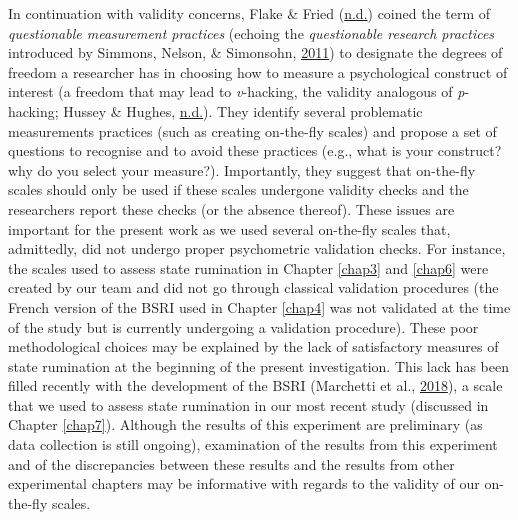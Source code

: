 \documentclass[a4paper,12pt,twoside,onecolumn,openright,final,oldfontcommands]{memoir}
\begin{document}
In continuation with validity concerns, Flake \& Fried (\protect\hyperlink{ref-flake_measurement_2019}{n.d.}) coined the term of \emph{questionable measurement practices} (echoing the \emph{questionable research practices} introduced by Simmons, Nelson, \& Simonsohn, \protect\hyperlink{ref-simmons_false-positive_2011}{2011}) to designate the degrees of freedom a researcher has in choosing how to measure a psychological construct of interest (a freedom that may lead to \emph{v}-hacking, the validity analogous of \emph{p}-hacking; Hussey \& Hughes, \protect\hyperlink{ref-hussey_hidden_2018}{n.d.}). They identify several problematic measurements practices (such as creating on-the-fly scales) and propose a set of questions to recognise and to avoid these practices (e.g., what is your construct? why do you select your measure?). Importantly, they suggest that on-the-fly scales should only be used if these scales undergone validity checks and the researchers report these checks (or the absence thereof). These issues are important for the present work as we used several on-the-fly scales that, admittedly, did not undergo proper psychometric validation checks. For instance, the scales used to assess state rumination in Chapter \ref{chap3} and \ref{chap6} were created by our team and did not go through classical validation procedures (the French version of the BSRI used in Chapter \ref{chap4} was not validated at the time of the study but is currently undergoing a validation procedure). These poor methodological choices may be explained by the lack of satisfactory measures of state rumination at the beginning of the present investigation. This lack has been filled recently with the development of the BSRI (Marchetti et al., \protect\hyperlink{ref-marchetti_brief_2018}{2018}), a scale that we used to assess state rumination in our most recent study (discussed in Chapter \ref{chap7}). Although the results of this experiment are preliminary (as data collection is still ongoing), examination of the results from this experiment and of the discrepancies between these results and the results from other experimental chapters may be informative with regards to the validity of our on-the-fly scales.
\end{document}
